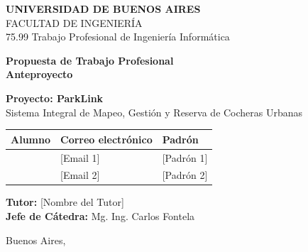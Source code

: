 \documentclass[11pt, a4paper]{article}
\begin{document}
\begin{titlepage}
    \centering
    \vspace*{1cm}
    
    {\Large \textbf{UNIVERSIDAD DE BUENOS AIRES}} \\
    {\large FACULTAD DE INGENIERÍA} \\
    \vspace{0.4cm}
    {\large 75.99 Trabajo Profesional de Ingeniería Informática} \\
    
    \vspace{2.5cm}
    
    {\Huge \textbf{Propuesta de Trabajo Profesional \\ \vspace{0.3cm} Anteproyecto}} \\
    
    \vspace{1.5cm}
    
    {\Large \textbf{Proyecto: ParkLink}} \\
    \vspace{0.3cm}
    {\large Sistema Integral de Mapeo, Gestión y Reserva de Cocheras Urbanas} \\
    
    \vspace{3cm}
    
    \begin{tabular}{l l l}
        \textbf{Alumno} & \textbf{Correo electrónico} & \textbf{Padrón} \\
        \midrule
        [Nombre Alumno 1] & [Email 1] & [Padrón 1] \\
        [Nombre Alumno 2] & [Email 2] & [Padrón 2] \\
    \end{tabular}
    
    \vspace{2cm}
    
    \begin{flushleft}
        \textbf{Tutor:} [Nombre del Tutor] \\
        \textbf{Jefe de Cátedra:} Mg. Ing. Carlos Fontela
    \end{flushleft}
    
    \vfill
    {\large Buenos Aires, \the\year}
\end{titlepage}

\newpage

\end{document}
